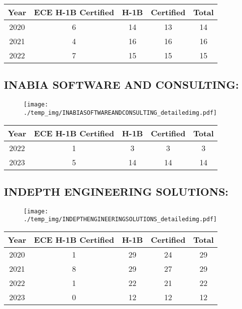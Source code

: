 \documentclass{article}%
\begin{document}
%
\begin{longtable}{c|c|c|c|c}%
\hline%
Year&ECE H{-}1B Certified&H{-}1B&Certified&Total\\%
\hline%
2020&6&14&13&14\\%
\hline%
2021&4&16&16&16\\%
\hline%
2022&7&15&15&15\\%
\hline%
\end{longtable}

%
\newpage%
\subsection{INABIA SOFTWARE AND CONSULTING:}%
\label{subsec:INABIASOFTWAREANDCONSULTING}%
\label{INABIASOFTWAREANDCONSULTINGdetailed}%


\begin{figure}[htbp]%
\centering%
\texttt{[image: ./temp\_img/INABIASOFTWAREANDCONSULTING\_detailedimg.pdf]}%
\end{figure}

%
\begin{longtable}{c|c|c|c|c}%
\hline%
Year&ECE H{-}1B Certified&H{-}1B&Certified&Total\\%
\hline%
2022&1&3&3&3\\%
\hline%
2023&5&14&14&14\\%
\hline%
\end{longtable}

%
\newpage%
\subsection{INDEPTH ENGINEERING SOLUTIONS:}%
\label{subsec:INDEPTHENGINEERINGSOLUTIONS}%
\label{INDEPTHENGINEERINGSOLUTIONSdetailed}%


\begin{figure}[htbp]%
\centering%
\texttt{[image: ./temp\_img/INDEPTHENGINEERINGSOLUTIONS\_detailedimg.pdf]}%
\end{figure}

%
\begin{longtable}{c|c|c|c|c}%
\hline%
Year&ECE H{-}1B Certified&H{-}1B&Certified&Total\\%
\hline%
2020&1&29&24&29\\%
\hline%
2021&8&29&27&29\\%
\hline%
2022&1&22&21&22\\%
\hline%
2023&0&12&12&12\\%
\hline%
\end{longtable}
\end{document}
